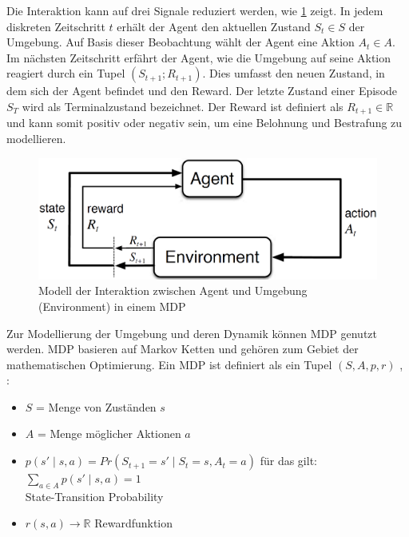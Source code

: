 Die Interaktion kann auf drei Signale reduziert werden, wie \cref{fig:rl_agent_environment_interaction} zeigt. 
In jedem diskreten Zeitschritt $t$ erhält der Agent den aktuellen Zustand $S_t \in S$ der Umgebung. 
Auf Basis dieser Beobachtung wählt der Agent eine Aktion $A_t \in A$. 
Im nächsten Zeitschritt erfährt der Agent, wie die Umgebung auf seine Aktion reagiert durch ein Tupel $(S_{t+1}; R_{t+1})$. 
Dies umfasst den neuen Zustand, in dem sich der Agent befindet und den Reward. 
Der letzte Zustand einer Episode $S_T$ wird als Terminalzustand bezeichnet. 
Der Reward ist definiert als $R_{t+1} \in \mathbb{R}$ und kann somit positiv oder negativ sein, um eine Belohnung und Bestrafung zu modellieren. \cite[S. 47 ff.]{suttonReinforcementLearningIntroduction2018}

\begin{figure}[h]
    \centering
    \includegraphics[scale=0.2]{04_Artefakte/01_Abbildungen/rl/rl_agent_environment_interaction.png}
    \caption[Modell der Interaktion zwischen Agent und Umgebung in einem \acs{MDP}]{Modell der Interaktion zwischen Agent und Umgebung (\engl Environment) in einem \acs{MDP} \protect\footnotemark}
    \label{fig:rl_agent_environment_interaction}
\end{figure}

Zur Modellierung der Umgebung und deren Dynamik können \ac{MDP} genutzt werden. \ac{MDP} basieren auf  Markov Ketten und gehören zum Gebiet der mathematischen Optimierung. Ein \ac{MDP} ist definiert als ein Tupel $(S,A,p,r)$ \cite[S. 47ff.]{suttonReinforcementLearningIntroduction2018}, \cite[S. 5]{kontesg.SeminarReinforcementLearning2021}:
\begin{itemize}
    \item $S$ = Menge von Zuständen $s$
    \item $A$ = Menge möglicher Aktionen $a$
    \item $p(s' \mid s,a) = Pr(S_{t+1}=s' \mid S_{t}=s, A_{t}=a)$ für das gilt: $\sum_{a\in A}p(s'\mid s,a) =1$ \\ State-Transition Probability 
    \item $r(s,a) \rightarrow \mathbb{R}$ Rewardfunktion
\end{itemize}

